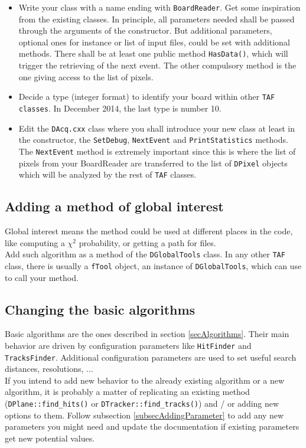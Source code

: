 \documentclass[a4paper, 12pt, twoside]{article}
\begin{document}
\begin{itemize}
\item Write your class with a name ending with {\tt BoardReader}. Get some inspiration from the existing classes. In principle, all parameters needed shall be passed through the arguments of the constructor. But additional parameters, optional ones for instance or list of input files, could be set with additional methods. There shall be at least one public method {\tt HasData()}, which will trigger the retrieving of the next event. The other compulsory method is the one giving access to the list of pixels.
\item Decide a type (integer format) to identify your board within other {\tt TAF classes}. In December 2014, the last type is number 10.
\item Edit the {\tt DAcq.cxx} class where you shall introduce your new class at least in the constructor, the {\tt SetDebug}, {\tt NextEvent} and {\tt PrintStatistics} methods. The {\tt NextEvent} method is extremely important since this is where the list of pixels from your BoardReader are transferred to the list of {\tt DPixel} objects which will be analyzed by the rest of {\tt TAF} classes.
\end{itemize}


\subsection{Adding a method of global interest}

\noindent
Global interest means the method could be used at different places in the code, like computing a $\chi^{2}$ probability, or getting a path for files.\\
\noindent
Add such algorithm as a method of the {\tt DGlobalTools} class. In any other {\tt TAF} class, there is usually a {\tt fTool} object, an instance of  {\tt DGlobalTools}, which can use to call your method.


\subsection{Changing the basic algorithms}

Basic algorithms are the ones described in section \ref{secAlgorithms}. Their main behavior are driven by configuration parameters like {\tt HitFinder} and {\tt TracksFinder}. Additional configuration parameters are used to set useful search distances, resolutions, ...\\
If you intend to add new behavior to the already existing algorithm or a new algorithm, it is probably a matter of replicating an existing method ({\tt DPlane::find\_hits()} or {\tt DTracker::find\_tracks()}) and / or adding new options to them. Follow subsection \ref{subsecAddingParameter} to add any new parameters you might need and update the documentation if existing parameters get new potential values.
\end{document}
